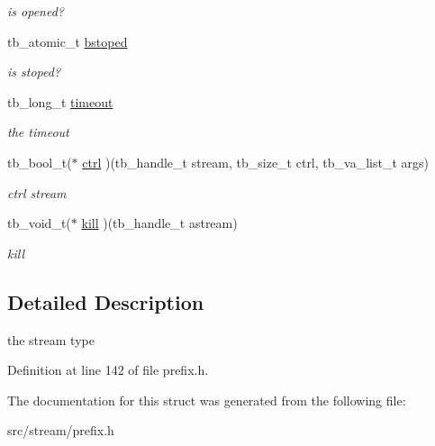 \begin{DoxyCompactItemize}
\begin{DoxyCompactList}\small\item\em is opened? \end{DoxyCompactList}\item 
\hypertarget{structtb__stream__t_a126a2dc8a7c3f6ef6ce69b7694595506}{tb\-\_\-atomic\-\_\-t \hyperlink{structtb__stream__t_a126a2dc8a7c3f6ef6ce69b7694595506}{bstoped}}\label{structtb__stream__t_a126a2dc8a7c3f6ef6ce69b7694595506}

\begin{DoxyCompactList}\small\item\em is stoped? \end{DoxyCompactList}\item 
\hypertarget{structtb__stream__t_a8b7bf56a0b76e592c6c7cfc295604527}{tb\-\_\-long\-\_\-t \hyperlink{structtb__stream__t_a8b7bf56a0b76e592c6c7cfc295604527}{timeout}}\label{structtb__stream__t_a8b7bf56a0b76e592c6c7cfc295604527}

\begin{DoxyCompactList}\small\item\em the timeout \end{DoxyCompactList}\item 
\hypertarget{structtb__stream__t_a847ac5253746071bba084f564cb12997}{tb\-\_\-bool\-\_\-t($\ast$ \hyperlink{structtb__stream__t_a847ac5253746071bba084f564cb12997}{ctrl} )(tb\-\_\-handle\-\_\-t stream, tb\-\_\-size\-\_\-t ctrl, tb\-\_\-va\-\_\-list\-\_\-t args)}\label{structtb__stream__t_a847ac5253746071bba084f564cb12997}

\begin{DoxyCompactList}\small\item\em ctrl stream \end{DoxyCompactList}\item 
\hypertarget{structtb__stream__t_a6cc520b9b1197a8edd8240dcb04581fe}{tb\-\_\-void\-\_\-t($\ast$ \hyperlink{structtb__stream__t_a6cc520b9b1197a8edd8240dcb04581fe}{kill} )(tb\-\_\-handle\-\_\-t astream)}\label{structtb__stream__t_a6cc520b9b1197a8edd8240dcb04581fe}

\begin{DoxyCompactList}\small\item\em kill \end{DoxyCompactList}\end{DoxyCompactItemize}


\subsection{Detailed Description}
the stream type 

Definition at line 142 of file prefix.\-h.



The documentation for this struct was generated from the following file\-:\begin{DoxyCompactItemize}
\item 
src/stream/prefix.\-h\end{DoxyCompactItemize}
